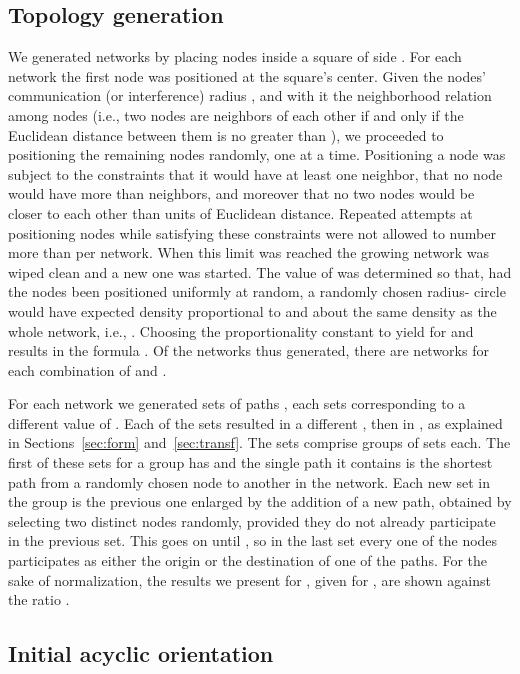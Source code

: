 \documentclass{article}
\begin{document}
\subsection{Topology generation}

We generated  networks by placing  nodes inside a square of side
. For each network the first node was positioned at the square's center.
Given the nodes' communication (or interference) radius , and with it the
neighborhood relation among nodes (i.e., two nodes are neighbors of each other
if and only if the Euclidean distance between them is no greater than ), we
proceeded to positioning the remaining nodes randomly, one at a time.
Positioning a node was subject to the constraints that it would have at least
one neighbor, that no node would have more than  neighbors, and moreover
that no two nodes would be closer to each other than  units of Euclidean
distance. Repeated attempts at positioning nodes while satisfying these
constraints were not allowed to number more than  per network. When this
limit was reached the growing network was wiped clean and a new one was started.
The value of  was determined so that, had the nodes been positioned uniformly
at random, a randomly chosen radius- circle would have expected density
proportional to  and about the same density as the whole network,
i.e., . Choosing the proportionality constant to yield
 for  and  results in the formula
. Of the  networks thus generated, there are 
networks for each combination of  and
.

For each network we generated  sets of paths
, each  sets
corresponding to a different value of . Each of the sets resulted in a
different , then in , as explained in Sections~\ref{sec:form}
and~\ref{sec:transf}. The  sets comprise  groups of  sets each.
The first of these sets for a group has  and the single path it contains is
the shortest path from a randomly chosen node to another in the network. Each
new set in the group is the previous one enlarged by the addition of a new path,
obtained by selecting two distinct nodes randomly, provided they do not already
participate in the previous set. This goes on until , so in the last set
every one of the  nodes participates as either the origin or the destination
of one of the  paths. For the sake of normalization, the results we present
for , given for , are shown against the ratio
.

\subsection{Initial acyclic orientation}
\end{document}
